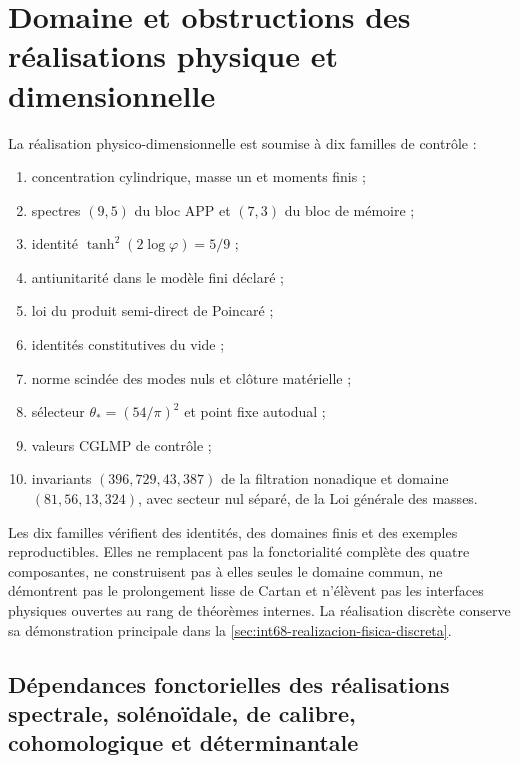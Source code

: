 \section[Contrôles de la réalisation physico-dimensionnelle]{Domaine et obstructions des réalisations physique et dimensionnelle}
\label{sec:int68-certificado-historico}

La réalisation physico-dimensionnelle est soumise à dix familles de contrôle :
\begin{enumerate}
 \item concentration cylindrique, masse un et moments finis ;
 \item spectres \((9,5)\) du bloc APP et \((7,3)\) du bloc de mémoire ;
 \item identité \(\tanh^2(2\log\varphi)=5/9\) ;
 \item antiunitarité dans le modèle fini déclaré ;
 \item loi du produit semi-direct de Poincaré ;
 \item identités constitutives du vide ;
 \item norme scindée des modes nuls et clôture matérielle ;
 \item sélecteur \(\theta_*=(54/\pi)^2\) et point fixe autodual ;
 \item valeurs CGLMP de contrôle ;
 \item invariants \((396,729,43,387)\) de la filtration nonadique et
       domaine \((81,56,13,324)\), avec secteur nul séparé, de la Loi
       générale des masses.
\end{enumerate}

\begin{controlbox}[title={Portée exacte des contrôles}]
Les dix familles vérifient des identités, des domaines finis et des exemples
reproductibles. Elles ne remplacent pas la fonctorialité complète des quatre
composantes, ne construisent pas à elles seules le domaine commun, ne démontrent pas le
prolongement lisse de Cartan et n'élèvent pas les interfaces physiques ouvertes au rang de
théorèmes internes. La réalisation discrète conserve sa démonstration principale
dans la \cref{sec:int68-realizacion-fisica-discreta}.
\end{controlbox}

\subsection{Dépendances fonctorielles des réalisations spectrale, solénoïdale, de calibre, cohomologique et déterminantale}

